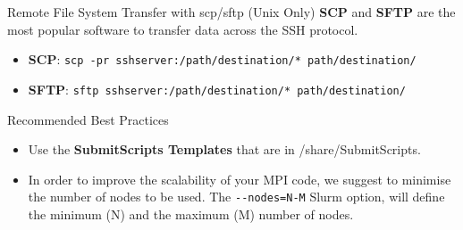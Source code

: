 \documentclass[final,t]{beamer}
\begin{document}
\begin{frame}[fragile]{}
\begin{columns}[t]
\begin{column}{.32\linewidth}
      \begin{block}{Remote File System Transfer with scp/sftp (Unix Only)}
       \textbf{SCP} and \textbf{SFTP} are the most popular software to transfer data across the SSH protocol.
        \begin{itemize}
        \item \textbf{SCP}: \verb|scp -pr sshserver:/path/destination/* path/destination/|
        \item \textbf{SFTP}: \verb|sftp sshserver:/path/destination/* path/destination/|
        \end{itemize}
      \end{block}

      \begin{block}{Recommended Best Practices}
      \begin{itemize}
         \item Use the \textbf{SubmitScripts Templates} that are in /share/SubmitScripts.
         \item In order to improve the scalability of your MPI code, we suggest to minimise the number of nodes to be used. The \verb|--nodes=N-M| Slurm option, will define the minimum (N) and the maximum (M) number of nodes.
        \end{itemize}
      \end{block}
 
    \end{column}
  \end{columns}
\end{frame}
\end{document}
